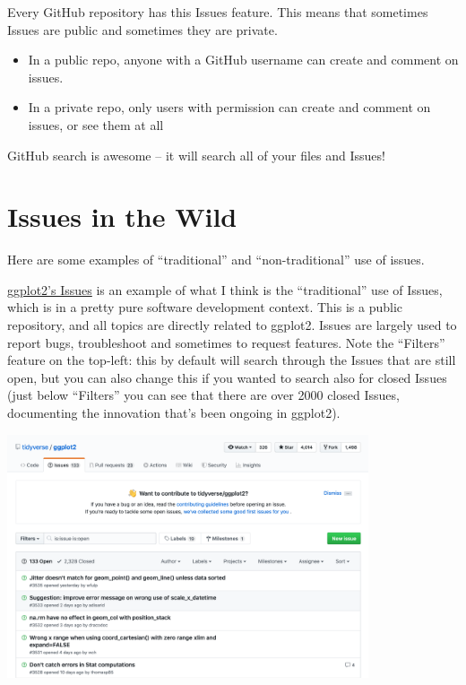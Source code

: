 \documentclass[
  letterpaper,
  DIV=11,
  numbers=noendperiod]{scrreprt}
\providecommand{\tightlist}{%
  \setlength{\itemsep}{0pt}\setlength{\parskip}{0pt}}
\begin{document}
Every GitHub repository has this Issues feature. This means that
sometimes Issues are public and sometimes they are private.

\begin{itemize}
\tightlist
\item
  In a public repo, anyone with a GitHub username can create and comment
  on issues.
\item
  In a private repo, only users with permission can create and comment
  on issues, or see them at all
\end{itemize}

GitHub search is awesome -- it will search all of your files and Issues!

\hypertarget{issues-in-the-wild}{%
\section{Issues in the Wild}\label{issues-in-the-wild}}

Here are some examples of ``traditional'' and ``non-traditional'' use of
issues.

\href{https://github.com/tidyverse/ggplot2/issues}{ggplot2's Issues} is
an example of what I think is the ``traditional'' use of Issues, which
is in a pretty pure software development context. This is a public
repository, and all topics are directly related to ggplot2. Issues are
largely used to report bugs, troubleshoot and sometimes to request
features. Note the ``Filters'' feature on the top-left: this by default
will search through the Issues that are still open, but you can also
change this if you wanted to search also for closed Issues (just below
``Filters'' you can see that there are over 2000 closed Issues,
documenting the innovation that's been ongoing in ggplot2).

\includegraphics[width=0.8\textwidth,height=\textheight]{./img/issues-ggplot2.png}
\end{document}
